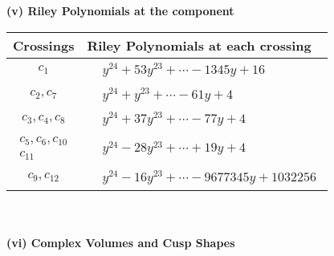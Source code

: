 \documentclass[1p]{elsarticle_modified}
\theoremstyle{definition}
\begin{document}
\newpage\renewcommand{\arraystretch}{1}
\flushleft \textbf{(v) Riley Polynomials at the component}\newline \\
\begin{tabular}{m{50pt}|m{274pt}}
Crossings & \hspace{64pt}Riley Polynomials at each crossing \\
\hline $$\begin{aligned}c_{1}\end{aligned}$$&$\begin{aligned}
&y^{24}+53 y^{23}+\cdots-1345 y+16
\end{aligned}$\\
\hline $$\begin{aligned}c_{2},c_{7}\end{aligned}$$&$\begin{aligned}
&y^{24}+y^{23}+\cdots-61 y+4
\end{aligned}$\\
\hline $$\begin{aligned}c_{3},c_{4},c_{8}\end{aligned}$$&$\begin{aligned}
&y^{24}+37 y^{23}+\cdots-77 y+4
\end{aligned}$\\
\hline $$\begin{aligned}c_{5},c_{6},c_{10}\\c_{11}\end{aligned}$$&$\begin{aligned}
&y^{24}-28 y^{23}+\cdots+19 y+4
\end{aligned}$\\
\hline $$\begin{aligned}c_{9},c_{12}\end{aligned}$$&$\begin{aligned}
&y^{24}-16 y^{23}+\cdots-9677345 y+1032256
\end{aligned}$\\
\hline
\end{tabular}\\~\\
\newpage\flushleft \textbf{(vi) Complex Volumes and Cusp Shapes}
\end{document}
